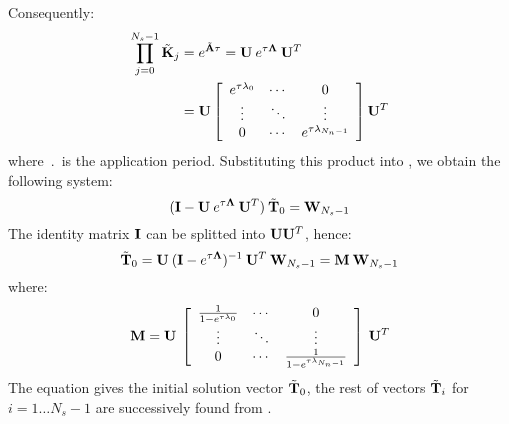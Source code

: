 Consequently:
\begin{align*}
  \prod_{j = 0}^{N_s - 1} \tilde{\mathbf{K}}_j & = e^{\tilde{\mathbf{A}} \tau} = \mathbf{U} \: e^{\tau \mathbf{\Lambda}} \: \mathbf{U}^T \\
    & = \mathbf{U} \left[
      \begin{array}{ccc}
        e^{\tau \lambda_0} & \cdots & 0 \\
        \vdots & \ddots & \vdots \\
        0 & \cdots & e^{\tau \lambda_{N_n - 1}}
      \end{array}
    \right] \mathbf{U}^T
\end{align*}
where $\period$ is the application period. Substituting this product into , we obtain the following system:
\[
  (\mathbf{I} - \mathbf{U} \: e^{\tau \mathbf{\Lambda}} \: \mathbf{U}^T) \: \tilde{\mathbf{T}}_0 = \mathbf{W}_{N_s - 1}
\]
The identity matrix $\mathbf{I}$ can be splitted into $\mathbf{U} \mathbf{U}^T$, hence:
\[
  \tilde{\mathbf{T}}_0 = \mathbf{U} \: (\mathbf{I} - e^{\tau \mathbf{\Lambda}})^{-1} \: \mathbf{U}^T \: \mathbf{W}_{N_s - 1} = \mathbf{M} \: \mathbf{W}_{N_s - 1}
\]
where:
\begin{equation} \label{eq:m-matrix}
  \mathbf{M} = \mathbf{U} \: \left[
      \begin{array}{ccc}
        \frac{1}{1 - e^{\tau \lambda_0}} & \cdots & 0 \\
        \vdots & \ddots & \vdots \\
        0 & \cdots & \frac{1}{1 - e^{\tau \lambda_{N_n - 1}}}
      \end{array}
    \right] \: \mathbf{U}^T
\end{equation}
The equation gives the initial solution vector $\tilde{\mathbf{T}}_0$, the rest of vectors $\tilde{\mathbf{T}}_i$ for \mbox{$i = 1 \dots N_s - 1$} are successively found from .

